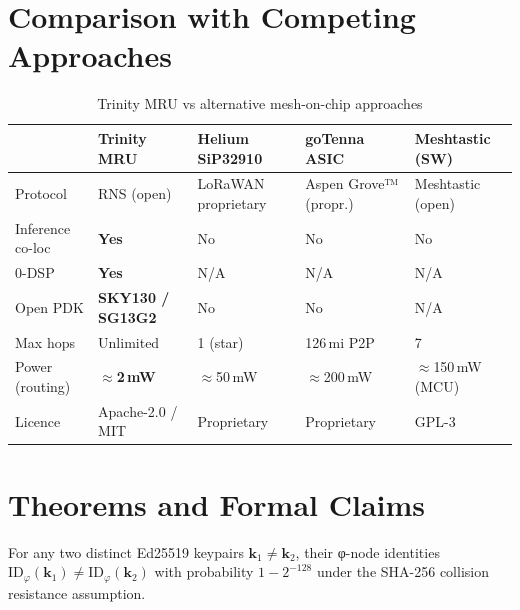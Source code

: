 \section{Comparison with Competing Approaches}

\begin{table}[h]
\centering
\caption{Trinity MRU vs alternative mesh-on-chip approaches}
\label{ch_35_mesh_node:tab:comparison}
\begin{tabular}{p{3cm}p{2.5cm}p{2.5cm}p{2.5cm}p{2.5cm}}
\toprule
 & \textbf{Trinity MRU} & \textbf{Helium SiP32910} & \textbf{goTenna ASIC} & \textbf{Meshtastic (SW)} \\
\midrule
Protocol         & RNS (open)       & LoRaWAN proprietary & Aspen Grove™ (propr.) & Meshtastic (open) \\
Inference co-loc & \textbf{Yes}     & No                  & No                    & No \\
0-DSP            & \textbf{Yes}     & N/A                 & N/A                   & N/A \\
Open PDK         & \textbf{SKY130 / SG13G2} & No          & No                    & N/A \\
Max hops         & Unlimited        & 1 (star)            & 126\,mi P2P           & 7 \\
Power (routing)  & \textbf{$\approx$2\,mW} & $\approx$50\,mW & $\approx$200\,mW & $\approx$150\,mW (MCU) \\
Licence          & Apache-2.0 / MIT & Proprietary         & Proprietary           & GPL-3 \\
\bottomrule
\end{tabular}
\end{table}

\section{Theorems and Formal Claims}

\begin{theorem}
\label{ch_35_mesh_node:thm:phi-id}
For any two distinct Ed25519 keypairs $\mathbf{k}_1 \neq \mathbf{k}_2$,
their φ-node identities $\text{ID}_\varphi(\mathbf{k}_1) \neq
\text{ID}_\varphi(\mathbf{k}_2)$ with probability
$1 - 2^{-128}$ under the SHA-256 collision resistance assumption.
\end{theorem}

